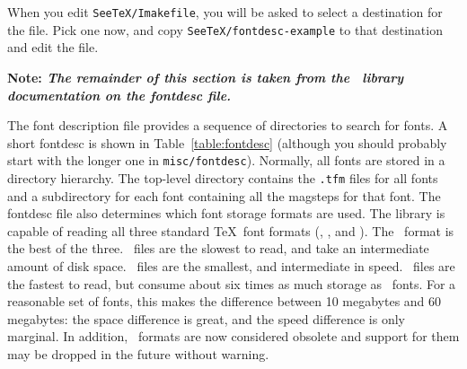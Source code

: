 
When you edit \verb|SeeTeX/Imakefile|, you will be asked to
select a destination for the {\fontdesc} file. Pick one now,
and copy \verb|SeeTeX/fontdesc-example| to
that destination and edit the file.

{\bf Note: \em The remainder of this section is taken from the
\mctex\ library documentation on the fontdesc file.}

The font description file provides a sequence of directories to
search for fonts.
A short fontdesc is shown in Table~\ref{table:fontdesc}
(although you should probably start with the longer one
in {\tt misc/fontdesc}).
Normally, all fonts are stored in a directory hierarchy.
The top-level directory contains the {\tt .tfm} files for all fonts
and a subdirectory for each font
containing all the magsteps for that font.
The fontdesc file also determines which font storage formats are used.
The library is capable of reading all three standard \TeX\ font formats
(\pk, \gf, and \pxl).
The \pk\ format is the best of the three.
\gf\ files are the slowest to read,
and take an intermediate amount of disk space.
\pk\ files are the smallest,
and intermediate in speed.
\pxl\ files are the fastest to read,
but consume about six times as much storage
as \pk\ fonts.
For a reasonable set of fonts,
this makes the difference between 10 megabytes
and 60 megabytes:
the space difference is great, and
the speed difference is only marginal.
In addition,
\pxl\ formats are now considered obsolete
and support for them may be dropped in the future
without warning.
%
%

